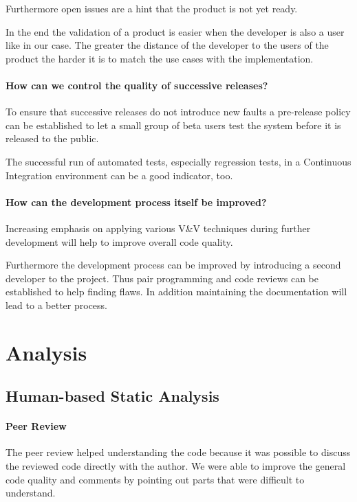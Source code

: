 \documentclass{scrartcl}
\begin{document}
Furthermore open issues are a hint that the product is not yet ready.

In the end the validation of a product is easier when the developer is also a user like in our case. The greater the distance of the developer to the users of the product the harder it is to match the use cases with the implementation. 

\paragraph{How can we control the quality of successive releases?}

To ensure that successive releases do not introduce new faults a pre-release policy can be established to let a small group of beta users test the system before it is released to the public.

The successful run of automated tests, especially regression tests, in a Continuous Integration environment can be a good indicator, too.

\paragraph{How can the development process itself be improved?}

Increasing emphasis on applying various V\&V techniques during further development will help to improve overall code quality. 

Furthermore the development process can be improved by introducing a second developer to the project. Thus pair programming and code reviews can be established to help finding flaws. In addition maintaining the documentation will lead to a better process.


\section{Analysis}

\subsection{Human-based Static Analysis}

\paragraph{Peer Review}

The peer review helped understanding the code because it was possible to discuss the reviewed code directly with the author.
We were able to improve the general code quality and comments by pointing out parts that were difficult to understand.
\end{document}
